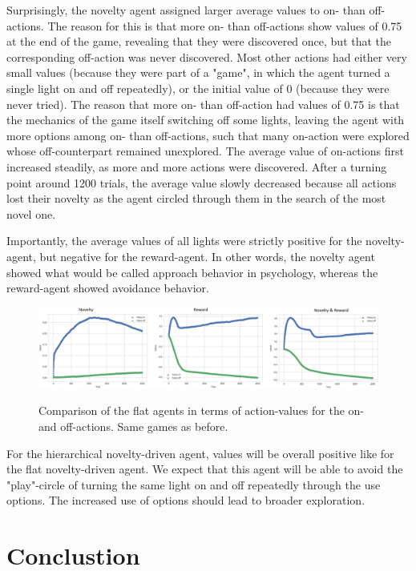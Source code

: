 \documentclass{article}
\begin{document}
Surprisingly, the novelty agent assigned larger average values to on- than off-actions. The reason for this is that more on- than off-actions show values of 0.75 at the end of the game, revealing that they were discovered once, but that the corresponding off-action was never discovered. Most other actions had either very small values (because they were part of a "game", in which the agent turned a single light on and off repeatedly), or the initial value of 0 (because they were never tried). The reason that more on- than off-action had values of 0.75 is that the mechanics of the game itself switching off some lights, leaving the agent with more options among on- than off-actions, such that many on-action were explored whose off-counterpart remained unexplored. The average value of on-actions first increased steadily, as more and more actions were discovered. After a turning point around 1200 trials, the average value slowly decreased because all actions lost their novelty as the agent circled through them in the search of the most novel one.

Importantly, the average values of all lights were strictly positive for the novelty-agent, but negative for the reward-agent. In other words, the novelty agent showed what would be called approach behavior in psychology, whereas the reward-agent showed avoidance behavior. 

\begin{figure}[h]
  \centering
  \includegraphics[width=\linewidth]{NIPSfigures/VFlat.png}
  \label{ResultsFlat}
  \caption{Comparison of the flat agents in terms of action-values for the on- and off-actions. Same games as before.}
\end{figure}

For the hierarchical novelty-driven agent, values will be overall positive like for the flat novelty-driven agent. We expect that this agent will be able to avoid the "play"-circle of turning the same light on and off repeatedly through the use options. The increased use of options should lead to broader exploration.


\section{Conclustion}
\end{document}
